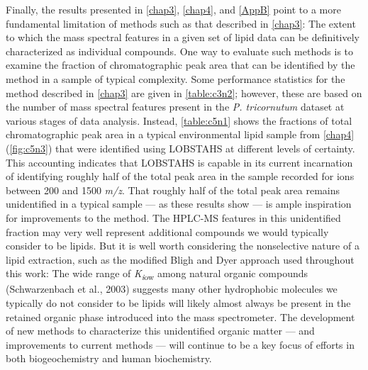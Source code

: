 Finally, the results presented in \autoref{chap3}, \autoref{chap4}, and \autoref{AppB} point to a more fundamental limitation of methods such as that described in \autoref{chap3}: The extent to which the mass spectral features in a given set of lipid data can be definitively characterized as individual compounds. One way to evaluate such methods is to examine the fraction of chromatographic peak area that can be identified by the method in a sample of typical complexity. Some performance statistics for the method described in \autoref{chap3} are given in \autoref{table:c3n2}; however, these are based on the number of mass spectral features present in the \emph{P. tricornutum} dataset at various stages of data analysis. Instead, \autoref{table:c5n1} shows the fractions of total chromatographic peak area in a typical environmental lipid sample from \autoref{chap4} (\autoref{fig:c5n3}) that were identified using LOBSTAHS at different levels of certainty. This accounting indicates that LOBSTAHS is capable in its current incarnation of identifying roughly half of the total peak area in the sample recorded for ions between 200 and 1500 \emph{m/z}. That roughly half of the total peak area remains unidentified in a typical sample --- as these results show --- is ample inspiration for improvements to the method. The HPLC-MS features in this unidentified fraction may very well represent additional compounds we would typically consider to be lipids. But it is well worth considering the nonselective nature of a lipid extraction, such as the modified Bligh and Dyer approach used throughout this work: The wide range of \emph{K}\textsubscript{\emph{i}ow} among natural organic compounds (Schwarzenbach et al., 2003) suggests many other hydrophobic molecules we typically do not consider to be lipids will likely almost always be present in the retained organic phase introduced into the mass spectrometer. The development of new methods to characterize this unidentified organic matter --- and improvements to current methods --- will continue to be a key focus of efforts in both biogeochemistry and human biochemistry.

